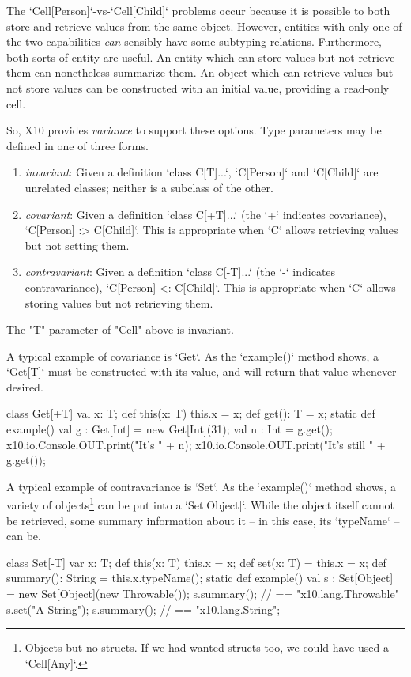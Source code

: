 The \xcd`Cell[Person]`-vs-\xcd`Cell[Child]` problems occur because it is
possible to both store and retrieve values from the same object. However,
entities with only one of the two capabilities {\em can} sensibly have some
subtyping relations. Furthermore, both sorts of entity are useful. An entity
which can store values but not retrieve them can nonetheless summarize them.
An object which can retrieve values but not store values can be constructed
with an initial value, providing a read-only cell.

So, X10 provides {\em variance} to support these options.  Type parameters
may be defined in one of three forms.  
\begin{enumerate}
\item {\em invariant}: Given a definition \xcd`class C[T]{...}`, \xcd`C[Person]` and
      \xcd`C[Child]` are unrelated classes; neither is a subclass of the
      other.
\item {\em covariant}: Given a definition \xcd`class C[+T]{...}` (the \xcd`+` indicates
      covariance), \xcd`C[Person] :> C[Child]`.  This is appropriate when
      \xcd`C` allows retrieving values but not setting them.
\item {\em contravariant}: Given a definition \xcd`class C[-T]{...}` (the \xcd`-` indicates
      contravariance), \xcd`C[Person] <: C[Child]`.  This is appropriate when
      \xcd`C` allows storing values but not retrieving them.
\end{enumerate}


The \xcd"T" parameter of \xcd"Cell" above is
invariant.  

A typical example of covariance is \xcd`Get`.  As the \xcd`example()` method
shows, a \xcd`Get[T]` must be constructed with its value, and will return that
value whenever desired.
\begin{xten}
class Get[+T] {
  val x: T;
  def this(x: T) { this.x = x; }
  def get(): T = x;
  static def example() {
     val g : Get[Int] = new Get[Int](31);
     val n : Int = g.get();
     x10.io.Console.OUT.print("It's " + n);
     x10.io.Console.OUT.print("It's still " + g.get());
  }
}
\end{xten}


A typical example of contravariance is \xcd`Set`.  As the \xcd`example()`
method shows,  a variety of objects\footnote{Objects but no structs.  If we
had wanted structs too, we could have used a \xcd`Cell[Any]`.}  can be put
into a 
\xcd`Set[Object]`.  While the object itself cannot be retrieved, some summary
information about it -- in this case, its \xcd`typeName` -- can be.  
\begin{xten}
class Set[-T] {
  var x: T;
  def this(x: T) { this.x = x; }
  def set(x: T) = { this.x = x; } 
  def summary(): String = this.x.typeName();
  static def example() {
    val s : Set[Object] = new Set[Object](new Throwable());
    s.summary(); // == "x10.lang.Throwable"
    s.set("A String");
    s.summary(); // == "x10.lang.String";
  }    
}
\end{xten}
%


